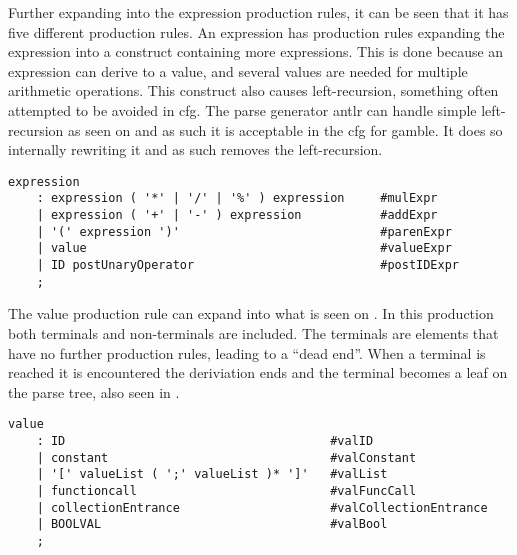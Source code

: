 Further expanding into the expression production rules, it can be seen that it has five different production rules.
An expression has production rules expanding the expression into a construct containing more expressions.
This is done because an expression can derive to a value, and several values are needed for multiple arithmetic operations.
This construct also causes left-recursion, something often attempted to be avoided in \acrshort{cfg}.
The parse generator \acrshort{antlr} can handle simple left-recursion as seen on  and as such it is acceptable in the \acrshort{cfg} for \gls{gamble}.
It does so internally rewriting it and as such removes the left-recursion.
\begin{lstlisting}[caption={\acrshort{cfg} Expression},frame=tlrb,label={lst:expression},numbers=none]
expression
    : expression ( '*' | '/' | '%' ) expression     #mulExpr
    | expression ( '+' | '-' ) expression           #addExpr
    | '(' expression ')'                            #parenExpr
    | value                                         #valueExpr
    | ID postUnaryOperator                          #postIDExpr
    ;
\end{lstlisting}
  
The value production rule can expand into what is seen on .
In this production both terminals and non-terminals are included.
The terminals are elements that have no further production rules, leading to a ``dead end''.
When a terminal is reached it is encountered the deriviation ends and the terminal becomes a leaf on the parse tree, also seen in .
\begin{lstlisting}[caption={\acrshort{cfg} Value},frame=tlrb,label={lst:value},numbers=none]
value
    : ID                                     #valID
    | constant                               #valConstant
    | '[' valueList ( ';' valueList )* ']'   #valList
    | functioncall                           #valFuncCall
    | collectionEntrance                     #valCollectionEntrance
    | BOOLVAL                                #valBool
    ;
\end{lstlisting}


